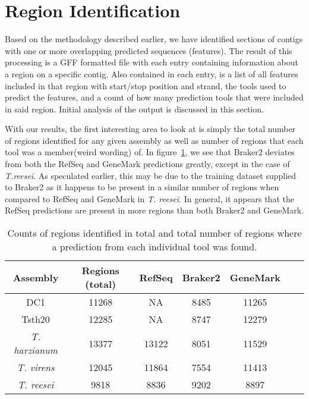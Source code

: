 \section{Region Identification}

Based on the methodology described earlier, we have identified
sections of contigs with one or more overlapping predicted sequences
(features). The result of this processing is a GFF formatted file with
each entry containing information about a region on a specific
contig. Also contained in each entry, is a list of all features
included in that region with start/stop position and strand, the tools
used to predict the features, and a count of how many prediction tools
that were included in said region. Initial analysis of the output is
discussed in this section.

With our results, the first interesting area to look at is simply the
total number of regions identified for any given assembly as well as
number of regions that each tool was a member(weird wording) of. In
figure~\ref{regioncounts}, we see that Braker2 deviates from both the
RefSeq and GeneMark predictions greatly, except in the case of
\textit{T.reesei}. As speculated earlier, this may be due to the
training dataset supplied to Braker2 as it happens to be present in a
similar number of regions when compared to RefSeq and GeneMark in
\textit{T. reesei}. In general, it appears that the RefSeq predictions
are present in more regions than both Braker2 and GeneMark. 

\begin{table}
  \begin{center}
    \begin{tabular}{|c|c|c|c|c|c|c|}
      \hline
      Assembly & Regions (total) & RefSeq & Braker2 & GeneMark \\ \hline
      DC1 & 11268 & NA & 8485 & 11265 \\ \hline
      Tsth20 & 12285 & NA & 8747 & 12279 \\ \hline
      \textit{T. harzianum} & 13377 & 13122 & 8051 & 11529 \\ \hline
      \textit{T. virens} & 12045 & 11864 & 7554 & 11413 \\ \hline
      \textit{T. reesei} & 9818 & 8836 & 9202 & 8897\\ \hline
    \end{tabular}
  \end{center}
  \caption{Counts of regions identified in total and total number of
    regions where a prediction from each individual tool was found.}
  \label{regioncounts}
\end{table}

